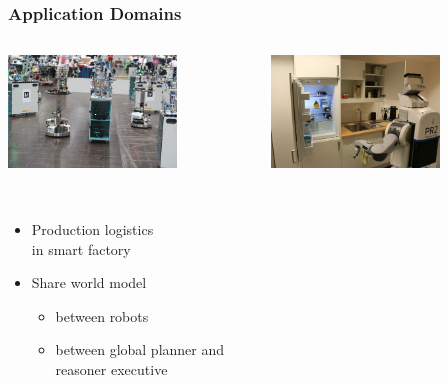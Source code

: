\begin{frame}
  \frametitle{Application Domains}
  \begin{columns}
    \begin{column}{0.5\textwidth}
      \centering
      \includegraphics[width=0.7\textwidth]{../thesis/img/rcll-feld}
  \begin{description}[]
  \item[RoboCup Logistics League] \hfill \\
    \begin{itemize}
    \item Production logistics\\ in smart factory
    \item Share world model
    \begin{itemize}
    \item between robots
    \item between global planner and reasoner executive
    \end{itemize}
    \end{itemize}
  \end{description}
    \end{column}
    \begin{column}{0.5\textwidth}
    \centering
    \includegraphics[width=0.7\textwidth]{../thesis/img/pr2-kbsg-kitchen}
  \begin{description}[]

\end{description}
\end{column}
\end{columns}
\end{frame}
